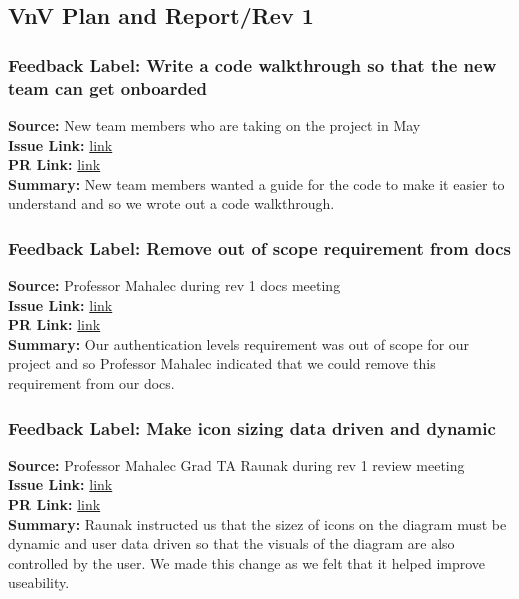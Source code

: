 \documentclass{article}
\begin{document}
\subsection{VnV Plan and Report/Rev 1}

    \subsubsection*{Feedback Label: Write a code walkthrough so that the new team can get onboarded}
    \textbf{Source:} New team members who are taking on the project in May\\
    \textbf{Issue Link:} \href{https://github.com/MadhuranS/capstone/issues/393}{link} \\
    \textbf{PR Link:} \href{https://github.com/MadhuranS/capstone/pull/392}{link} \\
    \textbf{Summary:} New team members wanted a guide for the code to make it easier to understand and so we wrote out a code walkthrough. 

    \subsubsection*{Feedback Label: Remove out of scope requirement from docs}
    \textbf{Source:} Professor Mahalec during rev 1 docs meeting\\
    \textbf{Issue Link:} \href{https://github.com/MadhuranS/capstone/issues/394}{link} \\
    \textbf{PR Link:} \href{https://github.com/MadhuranS/capstone/pull/391}{link} \\
    \textbf{Summary:} Our authentication levels requirement was out of scope for our project and so Professor Mahalec indicated that we could remove this requirement from our docs. 

    \subsubsection*{Feedback Label: Make icon sizing data driven and dynamic}
    \textbf{Source:} Professor Mahalec Grad TA Raunak during rev 1 review meeting\\
    \textbf{Issue Link:} \href{https://github.com/MadhuranS/capstone/issues/348}{link} \\
    \textbf{PR Link:} \href{https://github.com/MadhuranS/capstone/pull/382}{link} \\
    \textbf{Summary:} Raunak instructed us that the sizez of icons on the diagram must be dynamic and user data driven so that the visuals of the diagram are also controlled by the user. We made this change as we felt that it helped improve useability. 
\end{document}
